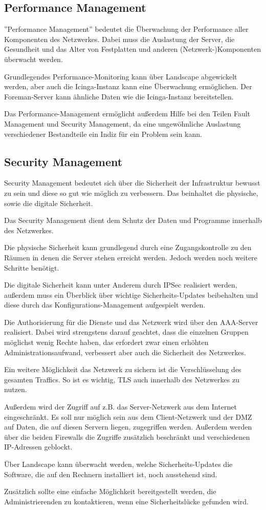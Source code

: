 \subsection{Performance Management}
''Performance Management'' bedeutet die Überwachung der Performance aller Komponenten des Netzwerkes. Dabei muss die Auslastung der Server, die Gesundheit und das Alter von Festplatten und anderen (Netzwerk-)Komponenten überwacht werden.

Grundlegendes Performance-Monitoring kann über Landscape abgewickelt werden, aber auch die Icinga-Instanz kann eine Überwachung ermöglichen. 
Der Foreman-Server kann ähnliche Daten wie die Icinga-Instanz bereitstellen.

Das Performance-Management ermöglicht außerdem Hilfe bei den Teilen Fault Management und Security Management, da eine ungewöhnliche Auslastung verschiedener Bestandteile ein Indiz für ein Problem sein kann.

\newpage
\subsection{Security Management}
Security Management bedeutet sich über die Sicherheit der Infrastruktur bewusst zu sein und diese so gut wie möglich zu verbessern. Das beinhaltet die physische, sowie die digitale Sicherheit.

Das Security Management dient dem Schutz der Daten und Programme innerhalb des Netzwerkes.

Die physische Sicherheit kann grundlegend durch eine Zugangskontrolle zu den Räumen in denen die Server stehen erreicht werden. Jedoch werden noch weitere Schritte benötigt.

Die digitale Sicherheit kann unter Anderem durch IPSec realisiert werden, außerdem muss ein Überblick über wichtige Sicherheits-Updates beibehalten und diese durch das Konfigurations-Management aufgespielt werden.

Die Authorisierung für die Dienste und das Netzwerk wird über den AAA-Server realisiert. Dabei wird strengstens darauf geachtet, dass die einzelnen Gruppen möglichst wenig Rechte haben, das erfordert zwar einen erhöhten Administrationsaufwand, verbessert aber auch die Sicherheit des Netzwerkes.

Ein weitere Möglichkeit das Netzwerk zu sichern ist die Verschlüsselung des gesamten Traffics. So ist es wichtig, TLS auch innerhalb des Netzwerkes zu nutzen.

Außerdem wird der Zugriff auf z.B. das Server-Netzwerk aus dem Internet eingeschränkt. Es soll nur möglich sein aus dem Client-Netzwerk und der DMZ auf Daten, die auf diesen Servern liegen, zugegriffen werden. Außerdem werden über die beiden Firewalls die Zugriffe zusätzlich beschränkt und verschiedenen IP-Adressen geblockt.

Über Landscape kann überwacht werden, welche Sicherheits-Updates die Software, die auf den Rechnern installiert ist, noch ausstehend sind.

Zusätzlich sollte eine einfache Möglichkeit bereitgestellt werden, die Administrierenden zu kontaktieren, wenn eine Sicherheitslücke gefunden wird.